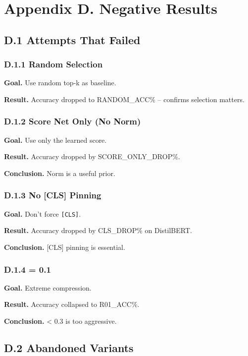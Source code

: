 \section{Appendix D. Negative Results}

\subsection{D.1 Attempts That Failed}

\subsubsection{D.1.1 Random Selection}

\textbf{Goal.} Use random top-k as baseline.

\textbf{Result.} Accuracy dropped to {{RANDOM\_ACC}}\% -- confirms selection matters.

\subsubsection{D.1.2 Score Net Only (No Norm)}

\textbf{Goal.} Use only the learned score.

\textbf{Result.} Accuracy dropped by {{SCORE\_ONLY\_DROP}}\%.

\textbf{Conclusion.} Norm is a useful prior.

\subsubsection{D.1.3 No [CLS] Pinning}

\textbf{Goal.} Don't force \texttt{[CLS]}.

\textbf{Result.} Accuracy dropped by {{CLS\_DROP}}\% on DistilBERT.

\textbf{Conclusion.} [CLS] pinning is essential.

\subsubsection{D.1.4   = 0.1}

\textbf{Goal.} Extreme compression.

\textbf{Result.} Accuracy collapsed to {{R01\_ACC}}\%.

\textbf{Conclusion.}   < 0.3 is too aggressive.

\subsection{D.2 Abandoned Variants}

